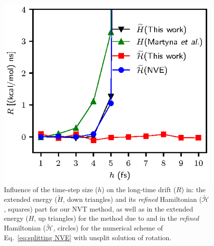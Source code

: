 \documentclass[
journal=jctcce,
layout=twocolumn
]{achemso}
\newcommand{\Ham}[1]{{\mathcal H}_\text{#1}}    %
\newcommand{\modified}[1]{\widetilde{#1}}
\begin{document}
\begin{figure}
	\includegraphics{Figures/energy_drift.eps}
    \caption{Influence of the time-step size ($h$) on the long-time drift ($R$) in: the extended energy ($\modified{H}$, down triangles) and its \textit{refined} Hamiltonian ($\modified{\Ham{}}$, squares) part for our NVT method, as well as in the extended energy ($H$, up triangles) for the method due to \citeauthor{Martyna_1996} \cite{Martyna_1996} and in the \textit{refined} Hamiltonian ($\modified{\Ham{}}$, circles) for the numerical scheme of Eq.~\ref{eq:splitting NVE} with unsplit solution of rotation.}
	\label{fig:energy_drift}
\end{figure}
\end{document}

